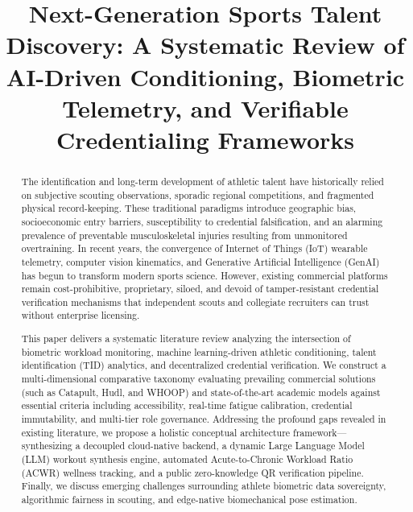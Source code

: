 \documentclass[conference]{IEEEtran}
\begin{document}
\title{Next-Generation Sports Talent Discovery: A Systematic Review of AI-Driven Conditioning, Biometric Telemetry, and Verifiable Credentialing Frameworks}

\author{
\and
{}
}

\maketitle

\begin{abstract}
The identification and long-term development of athletic talent have historically relied on subjective scouting observations, sporadic regional competitions, and fragmented physical record-keeping. These traditional paradigms introduce geographic bias, socioeconomic entry barriers, susceptibility to credential falsification, and an alarming prevalence of preventable musculoskeletal injuries resulting from unmonitored overtraining. In recent years, the convergence of Internet of Things (IoT) wearable telemetry, computer vision kinematics, and Generative Artificial Intelligence (GenAI) has begun to transform modern sports science. However, existing commercial platforms remain cost-prohibitive, proprietary, siloed, and devoid of tamper-resistant credential verification mechanisms that independent scouts and collegiate recruiters can trust without enterprise licensing. 

This paper delivers a systematic literature review analyzing the intersection of biometric workload monitoring, machine learning-driven athletic conditioning, talent identification (TID) analytics, and decentralized credential verification. We construct a multi-dimensional comparative taxonomy evaluating prevailing commercial solutions (such as Catapult, Hudl, and WHOOP) and state-of-the-art academic models against essential criteria including accessibility, real-time fatigue calibration, credential immutability, and multi-tier role governance. Addressing the profound gaps revealed in existing literature, we propose a holistic conceptual architecture framework---synthesizing a decoupled cloud-native backend, a dynamic Large Language Model (LLM) workout synthesis engine, automated Acute-to-Chronic Workload Ratio (ACWR) wellness tracking, and a public zero-knowledge QR verification pipeline. Finally, we discuss emerging challenges surrounding athlete biometric data sovereignty, algorithmic fairness in scouting, and edge-native biomechanical pose estimation.
\end{abstract}
\end{document}
